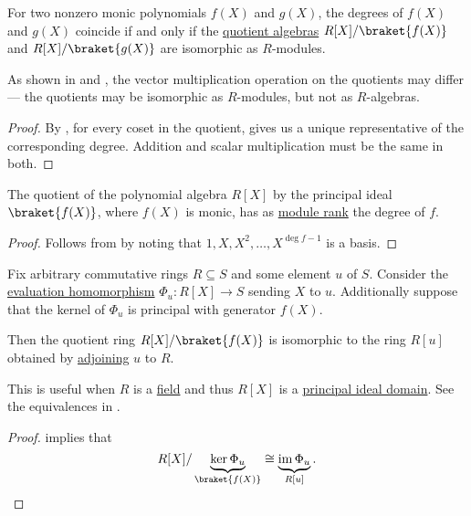 \begin{corollary}\label{thm:polynomial_quotient_modules_vs_algebras}
  For two nonzero monic polynomials \( f(X) \) and \( g(X) \), the degrees of \( f(X) \) and \( g(X) \) coincide if and only if the \hyperref[def:algebra_over_ring/quotient]{quotient algebras} \( R[X] / \braket{ f(X) } \) and \( R[X] / \braket{ g(X) } \) are isomorphic as \( R \)-modules.
\end{corollary}
\begin{comments}
  \item As shown in  and , the vector multiplication operation on the quotients may differ --- the quotients may be isomorphic as \( R \)-modules, but not as \( R \)-algebras.
\end{comments}
\begin{proof}
  By , for every coset in the quotient,  gives us a unique representative of the corresponding degree. Addition and scalar multiplication must be the same in both.
\end{proof}

\begin{corollary}\label{thm:polynomial_quotient_module_dimension}
  The quotient of the polynomial algebra \( R[X] \) by the principal ideal \( \braket{ f(X) } \), where \( f(X) \) is monic, has as \hyperref[def:module_rank]{module rank} the degree of \( f \).
\end{corollary}
\begin{proof}
  Follows from  by noting that \( 1, X, X^2, \ldots, X^{\deg f-1} \) is a basis.
\end{proof}

\begin{proposition}\label{thm:adjoint_roots_and_quotients}
  Fix arbitrary commutative rings \( R \subseteq S \) and some element \( u \) of \( S \). Consider the \hyperref[con:evaluation_homomorphism]{evaluation homomorphism} \( \Phi_u: R[X] \to S \) sending \( X \) to \( u \). Additionally suppose that the kernel of \( \Phi_u \) is principal with generator \( f(X) \).

  Then the quotient ring \( R[X] / \braket{ f(X) } \) is isomorphic to the ring \( R[u] \) obtained by \hyperref[def:semiring_adjunction]{adjoining} \( u \) to \( R \).
\end{proposition}
\begin{comments}
  \item This is useful when \( R \) is a \hyperref[def:field]{field} and thus \( R[X] \) is a \hyperref[def:principal_ideal_domain]{principal ideal domain}. See the equivalences in .
\end{comments}
\begin{proof}
   implies that
  \begin{equation*}
    R[X] / \underbrace{\ker \Phi_u}_{\braket{ f(X) }} \cong \underbrace{\img \Phi_u}_{R[u]}.
  \end{equation*}
\end{proof}

